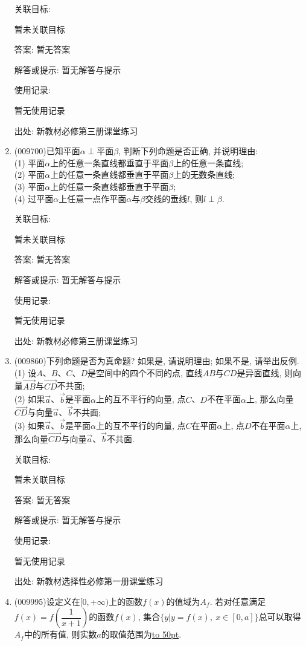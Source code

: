 \documentclass[10pt,a4paper]{article}
\newcommand{\blank}[1]{\underline{\hbox to #1pt{}}}
\begin{document}
\begin{enumerate}[1.]
关联目标:

暂未关联目标

答案: 暂无答案

解答或提示: 暂无解答与提示

使用记录:

暂无使用记录


出处: 新教材必修第三册课堂练习
\item { (009700)}已知平面$\alpha\perp$平面$\beta$, 判断下列命题是否正确, 并说明理由:\\ 
(1) 平面$\alpha$上的任意一条直线都垂直于平面$\beta$上的任意一条直线;\\
(2) 平面$\alpha$上的任意一条直线都垂直于平面$\beta$上的无数条直线;\\
(3) 平面$\alpha$上的任意一条直线都垂直于平面$\beta$;\\
(4) 过平面$\alpha$上任意一点作平面$\alpha$与$\beta$交线的垂线$l$, 则$l\perp \beta$.


关联目标:

暂未关联目标

答案: 暂无答案

解答或提示: 暂无解答与提示

使用记录:

暂无使用记录


出处: 新教材必修第三册课堂练习
\item { (009860)}下列命题是否为真命题? 如果是, 请说明理由; 如果不是, 请举出反例.\\
(1) 设$A$、$B$、$C$、$D$是空间中的四个不同的点, 直线$AB$与$CD$是异面直线, 则向量$\overrightarrow{AB}$与$\overrightarrow{CD}$不共面;\\
(2) 如果$\overrightarrow a$、$\overrightarrow b$是平面$\alpha$上的互不平行的向量, 点$C$、$D$不在平面$\alpha$上, 那么向量$\overrightarrow{CD}$与向量$\overrightarrow a$、$\overrightarrow b$不共面;\\
(3) 如果$\overrightarrow a$、$\overrightarrow b$是平面$\alpha$上的互不平行的向量, 点$C$在平面$\alpha$上, 点$D$不在平面$\alpha$上, 那么向量$\overrightarrow{CD}$与向量$\overrightarrow a$、$\overrightarrow b$不共面.


关联目标:

暂未关联目标

答案: 暂无答案

解答或提示: 暂无解答与提示

使用记录:

暂无使用记录


出处: 新教材选择性必修第一册课堂练习
\item { (009995)}设定义在$[0,+\infty)$上的函数$f(x)$的值域为$A_f$. 若对任意满足$f(x)=f(\dfrac 1{x+1})$的函数$f(x)$, 集合$\{y|y=f(x), \ x\in [0,a]\}$总可以取得$A_f$中的所有值, 则实数$a$的取值范围为\blank{50}.



\end{enumerate}
\end{document}
